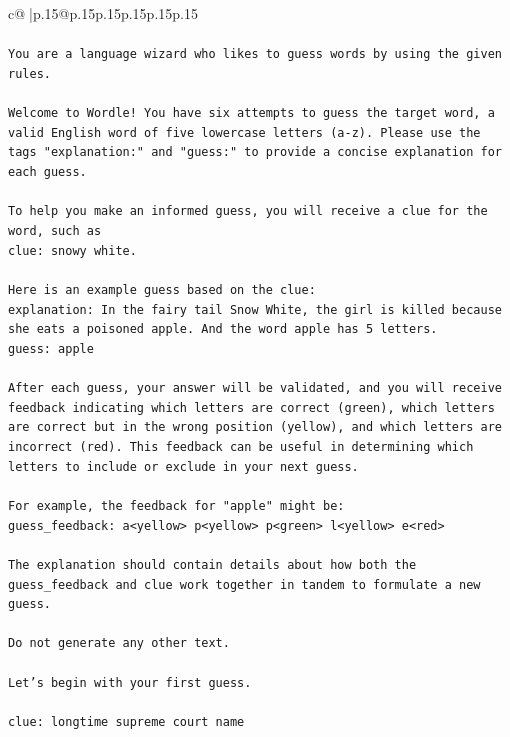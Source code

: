\documentclass{article}
\begin{document}
{\begin{supertabular}{c@{$\;$}|p{.15\linewidth}@{}p{.15\linewidth}p{.15\linewidth}p{.15\linewidth}p{.15\linewidth}p{.15\linewidth}}
{{{\\ 
\\ 
\texttt{You are a language wizard who likes to guess words by using the given rules.} \\
\\ 
\texttt{Welcome to Wordle! You have six attempts to guess the target word, a valid English word of five lowercase letters (a{-}z). Please use the tags "explanation:" and "guess:" to provide a concise explanation for each guess.} \\
\\ 
\texttt{To help you make an informed guess, you will receive a clue for the word, such as} \\
\texttt{clue: snowy white.} \\
\\ 
\texttt{Here is an example guess based on the clue:} \\
\texttt{explanation: In the fairy tail Snow White, the girl is killed because she eats a poisoned apple. And the word apple has 5 letters.} \\
\texttt{guess: apple} \\
\\ 
\texttt{After each guess, your answer will be validated, and you will receive feedback indicating which letters are correct (green), which letters are correct but in the wrong position (yellow), and which letters are incorrect (red). This feedback can be useful in determining which letters to include or exclude in your next guess.} \\
\\ 
\texttt{For example, the feedback for "apple" might be:} \\
\texttt{guess\_feedback: a<yellow> p<yellow> p<green> l<yellow> e<red>} \\
\\ 
\texttt{The explanation should contain details about how both the guess\_feedback and clue work together in tandem to formulate a new guess.} \\
\\ 
\texttt{Do not generate any other text.} \\
\\ 
\texttt{Let's begin with your first guess.} \\
\\ 
\texttt{clue: longtime supreme court name} \\
            }
        }
    }
     \\ \\


\end{supertabular}}
\end{document}
